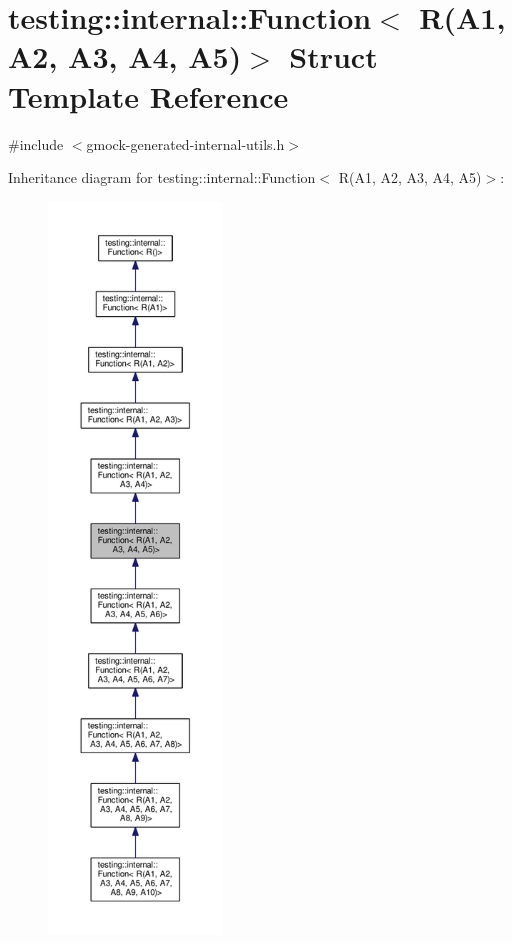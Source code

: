 \hypertarget{structtesting_1_1internal_1_1Function_3_01R_07A1_00_01A2_00_01A3_00_01A4_00_01A5_08_4}{}\section{testing\+:\+:internal\+:\+:Function$<$ R(A1, A2, A3, A4, A5)$>$ Struct Template Reference}
\label{structtesting_1_1internal_1_1Function_3_01R_07A1_00_01A2_00_01A3_00_01A4_00_01A5_08_4}


{\ttfamily \#include $<$gmock-\/generated-\/internal-\/utils.\+h$>$}



Inheritance diagram for testing\+:\+:internal\+:\+:Function$<$ R(A1, A2, A3, A4, A5)$>$\+:\nopagebreak
\begin{figure}[H]
\begin{center}
\leavevmode
\includegraphics[height=550pt]{structtesting_1_1internal_1_1Function_3_01R_07A1_00_01A2_00_01A3_00_01A4_00_01A5_08_4__inherit__graph}
\end{center}
\end{figure}


